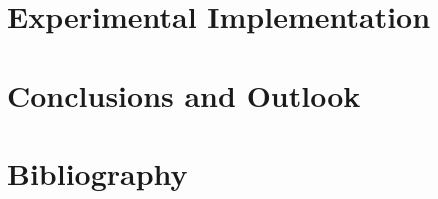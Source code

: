 \documentclass[a4paper, twoside, notitlepage, 10pt]{report}
\begin{document}
\chapter{Experimental Implementation}\label{ch:implementation}
    

\chapter{Conclusions and Outlook}\label{ch:conclusion}


\clearpage
\chapter*{Bibliography}

\printbibliography[heading=none]




\begin{appendices}

\renewcommand{\thesection}{\thechapter.\arabic{section}}
\renewcommand\thefigure{\thechapter.\arabic{figure}}
\renewcommand\theequation{\thechapter.\arabic{equation}}
 
\setcounter{equation}{0}
\setcounter{figure}{0}



 
\end{appendices}
\end{document}
